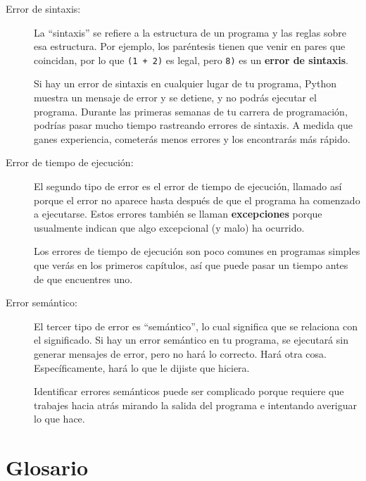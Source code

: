 \documentclass[10pt]{book}
\begin{document}
\begin{description}

\item[Error de sintaxis:] La ``sintaxis'' se refiere a la estructura de un programa
  y las reglas sobre esa estructura.  Por ejemplo, los paréntesis tienen
  que venir en pares que coincidan, por lo que {\tt (1 + 2)} es legal, pero {\tt 8)}
  es un {\bf error de sintaxis}.   

Si hay un error de sintaxis
en cualquier lugar de tu programa, Python muestra un mensaje de error y se detiene,
y no podrás ejecutar el programa.  Durante las primeras
semanas de tu carrera de programación, podrías pasar mucho
tiempo rastreando errores de sintaxis.  A medida que ganes experiencia,
cometerás menos errores y los encontrarás más rápido.


\item[Error de tiempo de ejecución:] El segundo tipo de error es el error de tiempo de ejecución,
  llamado así porque el error no aparece hasta después de que el programa ha
  comenzado a ejecutarse.  Estos errores también se llaman {\bf excepciones}
  porque usualmente indican que algo excepcional (y malo)
  ha ocurrido.   
    

Los errores de tiempo de ejecución son poco comunes en programas simples que verás en los
primeros capítulos, así que puede pasar un tiempo antes de que encuentres uno.


\item[Error semántico:] El tercer tipo de error es ``semántico'', lo cual
  significa que se relaciona con el significado.  Si hay un error semántico en tu
  programa, se ejecutará sin generar mensajes de error, pero
  no hará lo correcto.  Hará otra cosa.  Específicamente,
  hará lo que le dijiste que hiciera.  
   

Identificar errores semánticos puede ser complicado porque requiere que trabajes
hacia atrás mirando la salida del programa e intentando averiguar
lo que hace.

\end{description}


\section{Glosario}
\end{document}
